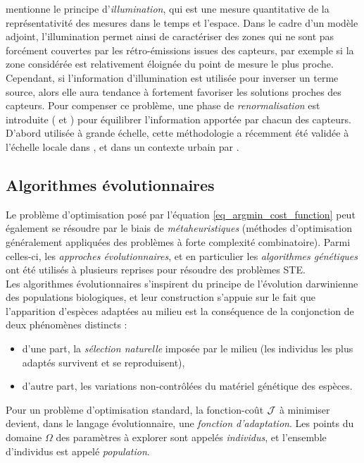  \cite{Issartel2005} mentionne le principe d'\textit{illumination}, qui est une mesure quantitative de la représentativité des mesures dans le temps et l'espace. Dans le cadre d'un modèle adjoint, l'illumination permet ainsi de caractériser des zones qui ne sont pas forcément couvertes par les rétro-émissions issues des capteurs, par exemple si la zone considérée est relativement éloignée du point de mesure le plus proche. Cependant, si l'information d'illumination est utilisée pour inverser un terme source, alors elle aura tendance à fortement favoriser les solutions proches des capteurs. Pour compenser ce problème, une phase de \textit{renormalisation} est introduite (\cite{Issartel2007} et \cite{Sharan2009}) pour équilibrer l'information apportée par chacun des capteurs. D'abord utilisée à grande échelle, cette méthodologie a récemment été validée à l'échelle locale dans \cite{Singh2014}, et dans un contexte urbain par \cite{Kumar2015}. \\
 
 
 \subsection{Algorithmes évolutionnaires}
 
 Le problème d'optimisation posé par l'équation \eqref{eq_argmin_cost_function} peut également se résoudre par le biais de \textit{métaheuristiques} (méthodes d'optimisation généralement appliquées des problèmes à forte complexité combinatoire). Parmi celles-ci, les \textit{approches évolutionnaires}, et en particulier les \textit{algorithmes génétiques} ont été utilisés à plusieurs reprises pour résoudre des problèmes STE.\\
 
Les algorithmes évolutionnaires s'inspirent du principe de l'évolution darwinienne des populations biologiques, et leur construction s'appuie sur le fait que l'apparition d'espèces adaptées au milieu est la conséquence de la conjonction de deux phénomènes distincts : 

 \begin{itemize}
 	\item d'une part, la \textit{sélection naturelle} imposée par le milieu (les individus les plus adaptés survivent et se reproduisent),
 	\item d'autre part, les variations non-contrôlées du matériel génétique des espèces.
 \end{itemize}
 
 Pour un problème d'optimisation standard, la fonction-coût ${\mathcal{J}}$ à minimiser devient, dans le langage évolutionnaire, une \textit{fonction d'adaptation}. Les points du domaine $\Omega$ des paramètres à explorer sont appelés \textit{individus}, et l'ensemble d'individus est appelé \textit{population}. \\
 
